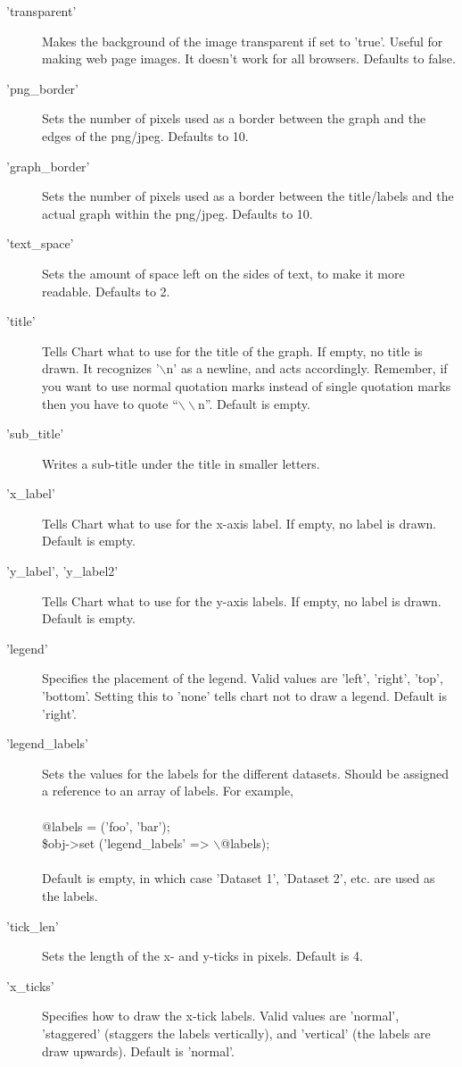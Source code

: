 \begin{description}
\item ['transparent']Makes the background of the image transparent if set to 'true'. Useful for making web page images. It doesn't work for all browsers. Defaults to false.
\item ['png\_border']Sets the number of pixels used as a border between the graph and the edges of the png/jpeg. Defaults to 10.
\item ['graph\_border']Sets the number of pixels used as a border between the title/labels and the actual graph within the png/jpeg.  Defaults to 10.
\item['text\_space']Sets the amount of space left on the sides of text, to make it more readable.  Defaults to 2.
\item['title']Tells Chart what to use for the title of the graph.  If empty, no title is drawn.  It recognizes '$\backslash$n' as a newline, and acts accordingly. Remember, if you want to use normal quotation marks instead of single quotation marks then you have to quote "`$\backslash\backslash$n"'. Default is empty.
\item['sub\_title']Writes a sub-title under the title in smaller letters.
\item['x\_label']Tells Chart what to use for the x-axis label.  If empty, no label is drawn.  Default is empty.
\item['y\_label', 'y\_label2']Tells Chart what to use for the y-axis labels.  If empty, no label is drawn.  Default is empty.
\item['legend']Specifies the placement of the legend.  Valid values are 'left', 'right', 'top', 'bottom'.  Setting this to 'none' tells chart not to draw a legend.  Default is 'right'.
\item['legend\_labels']Sets the values for the labels for the different datasets. Should be assigned a reference to an array of labels.  For example,\\
\\
@labels = ('foo', 'bar');\\
\$obj->set ('legend\_labels' => $\backslash$@labels);\\
\\
Default is empty, in which case 'Dataset 1', 'Dataset 2', etc. are used as the labels.
\item['tick\_len']Sets the length of the x- and y-ticks in pixels.  Default is 4.
\item['x\_ticks']Specifies how to draw the x-tick labels.  Valid values are 'normal', 'staggered' (staggers the labels vertically), and 'vertical' (the labels are draw upwards).  Default is 'normal'.

\end{description}
